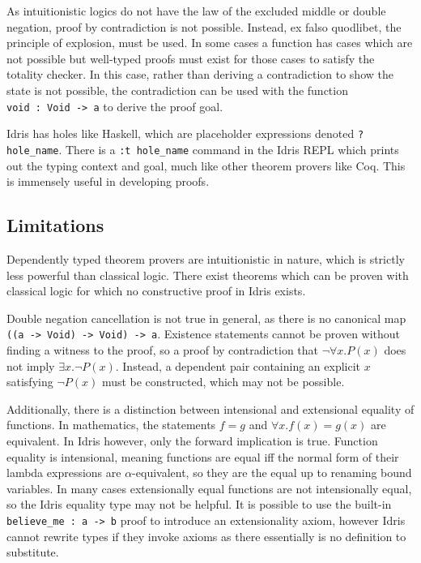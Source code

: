 \documentclass[]{report}
\begin{document}
As intuitionistic logics do not have the law of the excluded middle or double negation, proof by contradiction is not possible. Instead, ex falso quodlibet, the principle of explosion, must be used. In some cases a function has cases which are not possible but well-typed proofs must exist for those cases to satisfy the totality checker. In this case, rather than deriving a contradiction to show the state is not possible, the contradiction can be used with the function \texttt{void\ :\ Void\ ->\ a} to derive the proof goal.

Idris has holes like Haskell, which are placeholder expressions denoted \texttt{?hole_name}. There is a \texttt{:t hole_name} command in the Idris REPL which prints out the typing context and goal, much like other theorem provers like Coq. This is immensely useful in developing proofs.

\subsection{Limitations}

Dependently typed theorem provers are intuitionistic in nature, which is strictly less powerful than classical logic. There exist theorems which can be proven with classical logic for which no constructive proof in Idris exists.

Double negation cancellation is not true in general, as there is no canonical map \texttt{((a\ ->\ Void)\ ->\ Void)\ ->\ a}. Existence statements cannot be proven without finding a witness to the proof, so a proof by contradiction that $\neg\forall x.P(x)$ does not imply $\exists x.\neg P(x)$. Instead, a dependent pair containing an explicit $x$ satisfying $\neg P(x)$ must be constructed, which may not be possible.

Additionally, there is a distinction between intensional and extensional equality of functions. In mathematics, the statements $f=g$ and $\forall x. f(x)=g(x)$ are equivalent. In Idris however, only the forward implication is true. Function equality is intensional, meaning functions are equal iff the normal form of their lambda expressions are $\alpha$-equivalent, so they are the equal up to renaming bound variables. In many cases extensionally equal functions are not intensionally equal, so the Idris equality type may not be helpful. It is possible to use the built-in \texttt{believe\_me\ :\ a\ ->\ b} proof to introduce an extensionality axiom, however Idris cannot rewrite types if they invoke axioms as there essentially is no definition to substitute.
\end{document}
